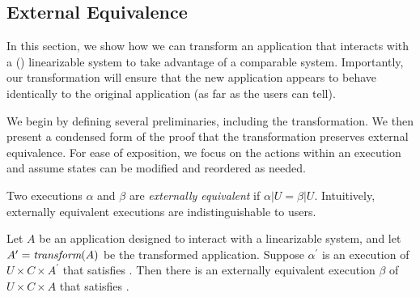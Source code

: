 \subsection{External Equivalence}
\label{sec:mdl:equivalence}

In this section, we show how we can transform an application that interacts with
a (\singledispatch{}) linearizable system to take advantage of a comparable
\multidispatch{} system. Importantly, our transformation will ensure that the new
application appears to behave identically to the original application (as far as
the users can tell).

We begin by defining several preliminaries, including the transformation. We then
present a condensed form of the proof that the transformation preserves external
equivalence. For ease of exposition, we focus on the actions within an
execution and assume states can be modified and reordered as needed.

 Two executions $\alpha$ and $\beta$ are
\textit{externally equivalent} if $\alpha|U = \beta|U$. Intuitively,
externally equivalent executions are indistinguishable to users.

\begin{thm}
Let $A$ be an application designed to interact with a linearizable system,
and let $A^\prime = \operatorname*{\textit{transform}}(A)$ be the transformed application. Suppose
$\alpha^\prime$ is an execution of $U \times C \times A^\prime$ that satisfies
\MDL{}. Then there is an externally equivalent execution $\beta$
of $U \times C \times A$ that satisfies \SDL{}.
\end{thm}

